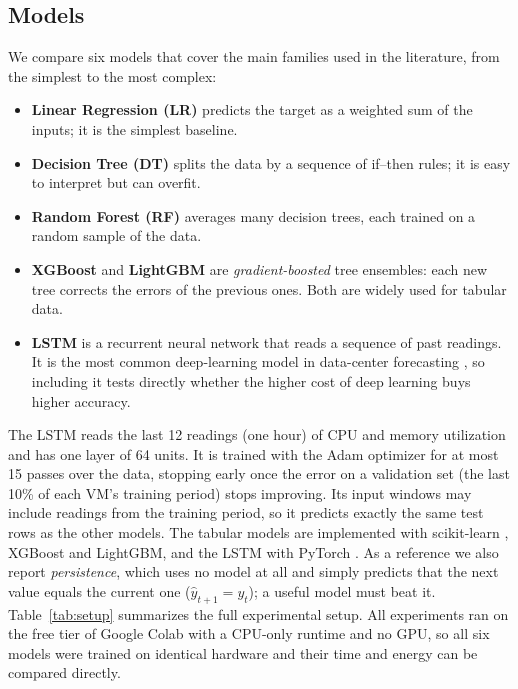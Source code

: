 \documentclass[conference,letterpaper,10pt]{IEEEtran}
\begin{document}
\subsection{Models}
We compare six models that cover the main families used in the literature, from the simplest to the most complex:
\begin{itemize}
  \item \textbf{Linear Regression (LR)} predicts the target as a weighted sum of the inputs; it is the simplest baseline.
  \item \textbf{Decision Tree (DT)} splits the data by a sequence of if--then rules; it is easy to interpret but can overfit.
  \item \textbf{Random Forest (RF)} \cite{breiman2001rf} averages many decision trees, each trained on a random sample of the data.
  \item \textbf{XGBoost} \cite{chen2016xgboost} and \textbf{LightGBM} \cite{ke2017lightgbm} are \emph{gradient-boosted} tree ensembles: each new tree corrects the errors of the previous ones. Both are widely used for tabular data.
  \item \textbf{LSTM} \cite{hochreiter1997lstm} is a recurrent neural network that reads a sequence of past readings. It is the most common deep-learning model in data-center forecasting \cite{mughees2025stlf,tariq2025nextgen,enyinnah2022lstm,kollu2024comparative}, so including it tests directly whether the higher cost of deep learning buys higher accuracy.
\end{itemize}
The LSTM reads the last 12 readings (one hour) of CPU and memory utilization and has one layer of 64 units. It is trained with the Adam optimizer for at most 15 passes over the data, stopping early once the error on a validation set (the last 10\% of each VM's training period) stops improving. Its input windows may include readings from the training period, so it predicts exactly the same test rows as the other models. The tabular models are implemented with scikit-learn \cite{pedregosa2011sklearn}, XGBoost and LightGBM, and the LSTM with PyTorch \cite{paszke2019pytorch}. As a reference we also report \emph{persistence}, which uses no model at all and simply predicts that the next value equals the current one ($\hat{y}_{t+1}=y_t$); a useful model must beat it. Table~\ref{tab:setup} summarizes the full experimental setup. All experiments ran on the free tier of Google Colab with a CPU-only runtime and no GPU, so all six models were trained on identical hardware and their time and energy can be compared directly.
\end{document}
